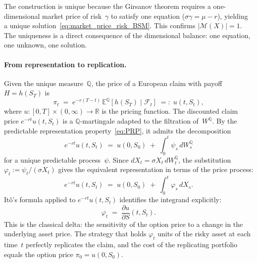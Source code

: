 The construction is unique because the Girsanov theorem requires a
one-dimensional market price of risk~$\gamma$ to satisfy one equation
($\sigma \gamma = \mu - r$), yielding a unique
solution~\eqref{eq:market_price_risk_BSM}.  This confirms
$|\mathcal{M}(X)| = 1$.  The uniqueness is a direct consequence of the
dimensional balance: one equation, one unknown, one solution.

\paragraph{From representation to replication.}
Given the unique measure~$\mathbb{Q}$, the price of a European claim
with payoff $H = h(S_T)$ is
\begin{equation}
\label{eq:BSM_price}
\pi_t \;=\; e^{-r(T-t)} \,
\mathbb{E}^{\mathbb{Q}}[h(S_T) \mid \mathcal{F}_t]
\;=:\; u(t, S_t),
\end{equation}
where $u : [0,T] \times (0,\infty) \to \mathbb{R}$ is the pricing
function.  The discounted claim price $e^{-rt} u(t, S_t)$ is a
$\mathbb{Q}$-martingale adapted to the filtration of~$W^{\mathbb{Q}}$.
By the predictable representation property~\eqref{eq:PRP}, it admits the
decomposition
\begin{equation}
\label{eq:mart_rep_BSM}
e^{-rt} u(t, S_t) \;=\; u(0, S_0)
\;+\; \int_0^t \psi_s \, dW_s^{\mathbb{Q}}
\end{equation}
for a unique predictable process~$\psi$.  Since
$dX_t = \sigma X_t \, dW_t^{\mathbb{Q}}$, the substitution
$\varphi_t := \psi_t / (\sigma X_t)$ gives the equivalent representation
in terms of the price process:
\begin{equation}
\label{eq:rep_in_X}
e^{-rt} u(t, S_t) \;=\; u(0, S_0)
\;+\; \int_0^t \varphi_s \, dX_s.
\end{equation}
It\^o's formula applied to $e^{-rt} u(t, S_t)$ identifies the integrand
explicitly:
\begin{equation}
\label{eq:delta_hedge}
\varphi_t \;=\; \frac{\partial u}{\partial S}(t, S_t).
\end{equation}
This is the classical delta: the sensitivity of the option price to a
change in the underlying asset price.  The strategy that holds
$\varphi_t$ units of the risky asset at each time~$t$ perfectly
replicates the claim, and the cost of the replicating portfolio equals
the option price $\pi_0 = u(0, S_0)$.

